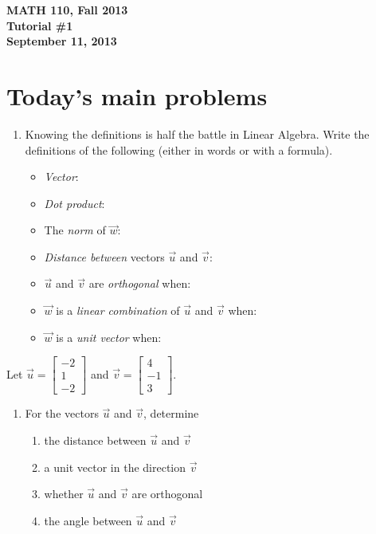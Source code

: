 \documentclass[11pt]{exam}
\newcommand{\vv}{\vspace{.2cm}}
\newcommand{\mat}[1]{\begin{bmatrix}#1\end{bmatrix}}
\newcommand{\mthCourse}{MATH 110}
\newcommand{\mthTerm}{Fall 2013}
\newcommand{\mthTutorialNumber}{1}
\newcommand{\mthDate}{September 11, 2013}
\begin{document}
{\large
	\begin{center}
		{\bf \mthCourse, \mthTerm}\\ 
		{\bf Tutorial \#\mthTutorialNumber}\\
		{\bf \mthDate}
	\end{center}
}

\section*{Today's main problems}
\begin{enumerate}
	\item Knowing the definitions is half the battle in Linear Algebra.
	Write the definitions of the following (either in words or with a formula).
	\begin{itemize}
		\item  \emph{Vector}: \vv\vv\vv
		\item  \emph{Dot product}: \vv\vv\vv
		\item  The \emph{norm} of $\vec w$: \vv\vv\vv
		\item  \emph{Distance between} vectors $\vec u$ and $\vec v$: \vv\vv\vv
		\item  $\vec u$ and $\vec v$ are \emph{orthogonal} when: \vv\vv\vv
		\item  $\vec w$ is a \emph{linear combination} of $\vec u$ and $\vec v$ when: \vv\vv\vv
		\item  $\vec w$ is a \emph{unit vector} when: \vv\vv\vv
	\end{itemize}
\end{enumerate}

\vspace{-1em}
Let $\vec u=\mat{-2\\1\\-2}$ and $\vec v=\mat{4\\-1\\3}$.
\begin{enumerate}[resume]
	\item For the vectors $\vec u$ and $\vec v$, determine
	\begin{enumerate}
		\item the distance between $\vec u$ and $\vec v$
		\item a unit vector in the direction $\vec v$
		\item whether $\vec u$ and $\vec v$ are orthogonal
		\item the angle between $\vec u$ and $\vec v$
	\end{enumerate}
\end{enumerate}
\end{document}
